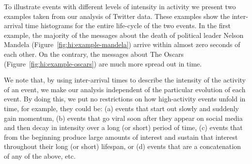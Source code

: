 

To illustrate events with different levels of intensity in activity we present
two examples taken from our analysis of Twitter data. 
%
These examples show the inter-arrival time histograms for the entire life-cycle of
the two events. 
%
In the first example, the majority of the messages about the death of political
leader Nelson Mandela (Figure~\ref{fig:hi:example-mandela}) arrive within almost
zero seconds of each other. 
%
On the contrary, the messages about The Oscars
(Figure~\ref{fig:hi:example-oscars}) are much more spread out in time.


We note that, by using inter-arrival times to describe the intensity of the
activity of an event, we make our analysis independent of the particular
evolution of each event. 
%
By doing this, we put no restrictions on how high-activity events unfold in
time, for example, they could be: 
%
(a) events that start out slowly and suddenly gain momentum, 
%
(b) events that go viral soon after they appear on social media and then decay
in intensity over a long (or short) period of time, 
%
(c) events that from the beginning produce large amounts of interest and sustain
that interest throughout their long (or short) lifespan, or 
%
(d) events that are a concatenation of any of the above, etc.
